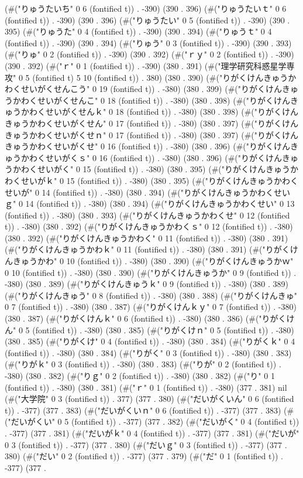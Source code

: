 (#("りゅうたいち" 0 6 (fontified t)) . -390) (390 . 396) (#("りゅうたいｔ" 0 6 (fontified t)) . -390) (390 . 396) (#("りゅうたい" 0 5 (fontified t)) . -390) (390 . 395) (#("りゅうた" 0 4 (fontified t)) . -390) (390 . 394) (#("りゅうｔ" 0 4 (fontified t)) . -390) (390 . 394) (#("りゅう" 0 3 (fontified t)) . -390) (390 . 393) (#("りゅ" 0 2 (fontified t)) . -390) (390 . 392) (#("ｒｙ" 0 2 (fontified t)) . -390) (390 . 392) (#("ｒ" 0 1 (fontified t)) . -390) (380 . 391) (#("理学研究科惑星学専攻" 0 5 (fontified t) 5 10 (fontified t)) . 380) (380 . 390) (#("りがくけんきゅうかわくせいがくせんこう" 0 19 (fontified t)) . -380) (380 . 399) (#("りがくけんきゅうかわくせいがくせんこ" 0 18 (fontified t)) . -380) (380 . 398) (#("りがくけんきゅうかわくせいがくせんｋ" 0 18 (fontified t)) . -380) (380 . 398) (#("りがくけんきゅうかわくせいがくせん" 0 17 (fontified t)) . -380) (380 . 397) (#("りがくけんきゅうかわくせいがくせｎ" 0 17 (fontified t)) . -380) (380 . 397) (#("りがくけんきゅうかわくせいがくせ" 0 16 (fontified t)) . -380) (380 . 396) (#("りがくけんきゅうかわくせいがくｓ" 0 16 (fontified t)) . -380) (380 . 396) (#("りがくけんきゅうかわくせいがく" 0 15 (fontified t)) . -380) (380 . 395) (#("りがくけんきゅうかわくせいがｋ" 0 15 (fontified t)) . -380) (380 . 395) (#("りがくけんきゅうかわくせいが" 0 14 (fontified t)) . -380) (380 . 394) (#("りがくけんきゅうかわくせいｇ" 0 14 (fontified t)) . -380) (380 . 394) (#("りがくけんきゅうかわくせい" 0 13 (fontified t)) . -380) (380 . 393) (#("りがくけんきゅうかわくせ" 0 12 (fontified t)) . -380) (380 . 392) (#("りがくけんきゅうかわくｓ" 0 12 (fontified t)) . -380) (380 . 392) (#("りがくけんきゅうかわく" 0 11 (fontified t)) . -380) (380 . 391) (#("りがくけんきゅうかわｋ" 0 11 (fontified t)) . -380) (380 . 391) (#("りがくけんきゅうかわ" 0 10 (fontified t)) . -380) (380 . 390) (#("りがくけんきゅうかｗ" 0 10 (fontified t)) . -380) (380 . 390) (#("りがくけんきゅうか" 0 9 (fontified t)) . -380) (380 . 389) (#("りがくけんきゅうｋ" 0 9 (fontified t)) . -380) (380 . 389) (#("りがくけんきゅう" 0 8 (fontified t)) . -380) (380 . 388) (#("りがくけんきゅ" 0 7 (fontified t)) . -380) (380 . 387) (#("りがくけんｋｙ" 0 7 (fontified t)) . -380) (380 . 387) (#("りがくけんｋ" 0 6 (fontified t)) . -380) (380 . 386) (#("りがくけん" 0 5 (fontified t)) . -380) (380 . 385) (#("りがくけｎ" 0 5 (fontified t)) . -380) (380 . 385) (#("りがくけ" 0 4 (fontified t)) . -380) (380 . 384) (#("りがくｋ" 0 4 (fontified t)) . -380) (380 . 384) (#("りがく" 0 3 (fontified t)) . -380) (380 . 383) (#("りがｋ" 0 3 (fontified t)) . -380) (380 . 383) (#("りが" 0 2 (fontified t)) . -380) (380 . 382) (#("りｇ" 0 2 (fontified t)) . -380) (380 . 382) (#("り" 0 1 (fontified t)) . -380) (380 . 381) (#("ｒ" 0 1 (fontified t)) . -380) (377 . 381) nil (#("大学院" 0 3 (fontified t)) . 377) (377 . 380) (#("だいがくいん" 0 6 (fontified t)) . -377) (377 . 383) (#("だいがくいｎ" 0 6 (fontified t)) . -377) (377 . 383) (#("だいがくい" 0 5 (fontified t)) . -377) (377 . 382) (#("だいがく" 0 4 (fontified t)) . -377) (377 . 381) (#("だいがｋ" 0 4 (fontified t)) . -377) (377 . 381) (#("だいが" 0 3 (fontified t)) . -377) (377 . 380) (#("だいｇ" 0 3 (fontified t)) . -377) (377 . 380) (#("だい" 0 2 (fontified t)) . -377) (377 . 379) (#("だ" 0 1 (fontified t)) . -377) (377 . 